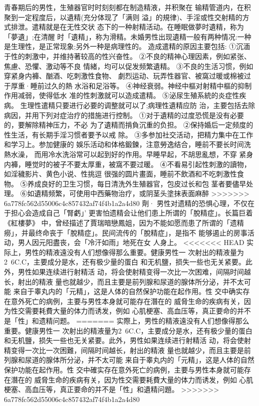 \documentclass[12pt,UTF8]{ctexbook}
\begin{document}
青春期后的男性，生殖器官时时刻刻都在制造精液，并积聚在
输精管道内，在积聚到一定程度后，以遺精(充分体现了「满则
溢」的規律)、手淫或性交射精的方式排泄。遣精就是在无性交状
态下的一种射精活动。在睡眠做夢时遺精，称为「夢遺」;在清醒
时「遺精」，称为滑精。未婚男性出现遺精一般有两种情况:一种
是生理性，是正常现象;另外一种是病理性的。
造成遣精的原因主要包括:
①沉湎于性的刺激中，并维持著较高的性兴奋性。
②不良的精神心理因素，例如紧张、焦慮、恐懼、激动等不良
情緒，均可以促发频繁遺精。
③不良的生活习惯，例如穿紧身内褲、酗酒、吃刺激性食物、
劇烈运动、玩弄性器官、被窩过暖或棉被过于厚重·睡前过久的熱
水浴和足浴等。
④神经衰弱。神经中樞对射精中樞的抑制作用减弱，使得低水
准的性刺激就可以造成遣精。
⑤泌尿生殖系統的炎症性疾病。
生理性遣精只要进行必要的调整就可以了;病理性遺精应防
治，主要包括去除病因，并用下列对症治疗的措施进行控制。
①对于遺精的过度恐慌是没有必要的，要解除精神压力，不必
为了遺精而掯負沉重的负担。
②保持婚后一定频度的性生活，有长期手淫习惯者要予以戒
除。
③多参加社交活动，把精力集中在工作和学习上。参加健康的
娛乐活动和体格鍛鍊，注意勞逸结合，睡前不要长时间洗熱水澡，
而用冷水洗浴常可以起到好的作用。早睡早起，不胡思亂想，不穿
紧身内褲，睡觉时的被子不要太厚重，被窩不要过暖。
④不看易引起性刺激的讀物，如淫穢影片、黄色小说、性挑逗
很强的圆片畫面，睡前不飲酒和不吃刺激性食物。
⑤养成良好的卫生习惯，每日清洗外生殖器官，包皮过长和包
茎者要儘早处理。
⑥如遺精频繁，可使用中西藥物治疗，或阴茎头塗抹表面麻醉
>>>>>>> 6a778fc562d55006c4c857432af74f4b1a2a4d80
劑·
男性对遗精的恐惧心理，不仅在于担心会造成自己「腎虧」’
更害怕遗精会让他们患上所谓的「脫精症」。长篇巨着《紅樓夢》
中，曾经描述了賈瑞暗戀鳳姐，因为不能如愿而患了所谓的「遗精
癆」，并最终命丧于「脫精症」。民间流传的「脫精症」，是指不
能够遏止的房事活动，男人因元阳盡丧，会「冷汗如雨」地死在女
人身上。
<<<<<<< HEAD
实际上，男性的精液遠没有人们想像得那么重要。健康男性一
次射出的精液量为2~6C.C，主要成分是水，还有极少量的蛋白
和无机鹽，损失一些也无关紧要。此外，男性如果连续进行射精活
动，将会使射精变得一次比一次困难，间隔时间越长，射出的精液
量也就越少，而且主要是前列腺和尿道的腺体所分泌，并不太可能
来自于睾丸内的「元精」，这是人体的自然保护功能在起作用。性
交中确实存在意外死亡的病例，主要与男性本身就可能存在潛在的
威脅生命的疾病有关，因为性交需要耗費大量的体力而诱发，例如
心肌梗塞、高血压等，真正要命的并不是「性」和遗精问题。
=======
实際上，男性的精液遠没有人们想像得那么重要。健康男性一
次射出的精液量为2~6C.C，主要成分是水，还有极少量的蛋白
和无机鹽，损失一些也无关紧要。此外，男性如果连续进行射精活
动，将会使射精变得一次比一次困難，间隔时间越长，射出的精液
量也就越少，而且主要是前列腺和尿道的腺体所分泌，并不太可能
来自于睾丸内的「元精」，这是人体的自然保护功能在起作用。性
交中確实存在意外死亡的病例，主要与男性本身就可能存在潛在的
威脅生命的疾病有关，因为性交需要耗費大量的体力而诱发，例如
心肌梗塞、高血压等，真正要命的并不是「性」和遺精问題。
>>>>>>> 6a778fc562d55006c4c857432af74f4b1a2a4d80
\end{document}

